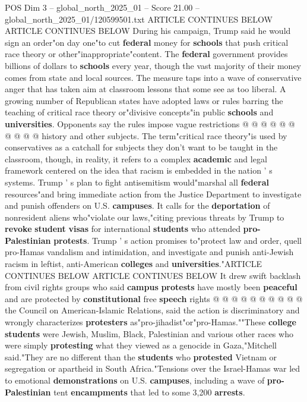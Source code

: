 \begin{textsample}{POS Dim 3 – global\_north\_2025\_01 – Score 21.00 – global\_north\_2025\_01/120599501.txt}
ARTICLE CONTINUES BELOW ARTICLE CONTINUES BELOW During his campaign, Trump said he would sign an order"on day one"to cut \textbf{federal} money for \textbf{schools} that push critical race theory or other"inappropriate"content.
The \textbf{federal} government provides billions of dollars to \textbf{schools} every year, though the vast majority of their money comes from state and local sources.
The measure taps into a wave of conservative anger that has taken aim at classroom lessons that some see as too liberal.
A growing number of Republican states have adopted laws or rules barring the teaching of critical race theory or"divisive concepts"in public \textbf{schools} and \textbf{universities}.
Opponents say the rules impose vague restrictions @ @ @ @ @ @ @ @ @ @ history and other subjects.
The term"critical race theory"is used by conservatives as a catchall for subjects they don't want to be taught in the classroom, though, in reality, it refers to a complex \textbf{academic} and legal framework centered on the idea that racism is embedded in the nation ' s systems.
Trump ' s plan to fight antisemitism would"marshal all \textbf{federal} resources"and bring immediate action from the Justice Department to investigate and punish offenders on U.S. \textbf{campuses}.
It calls for the \textbf{deportation} of nonresident aliens who"violate our laws,"citing previous threats by Trump to \textbf{revoke} \textbf{student} \textbf{visas} for international \textbf{students} who attended \textbf{pro-Palestinian} \textbf{protests}.
Trump ' s action promises to"protect law and order, quell pro-Hamas vandalism and intimidation, and investigate and punish anti-Jewish racism in leftist, anti-American \textbf{colleges} and \textbf{universities}."ARTICLE CONTINUES BELOW ARTICLE CONTINUES BELOW It drew swift backlash from civil rights groups who said \textbf{campus} \textbf{protests} have mostly been \textbf{peaceful} and are protected by \textbf{constitutional} free \textbf{speech} rights @ @ @ @ @ @ @ @ @ @ the Council on American-Islamic Relations, said the action is discriminatory and wrongly characterizes \textbf{protesters} as"pro-jihadist"or"pro-Hamas.""These \textbf{college} \textbf{students} were Jewish, Muslim, Black, Palestinian and various other races who were simply \textbf{protesting} what they viewed as a genocide in Gaza,"Mitchell said."They are no different than the \textbf{students} who \textbf{protested} Vietnam or segregation or apartheid in South Africa."Tensions over the Israel-Hamas war led to emotional \textbf{demonstrations} on U.S. \textbf{campuses}, including a wave of \textbf{pro-Palestinian} tent \textbf{encampments} that led to some 3,200 \textbf{arrests}.

\end{textsample}
